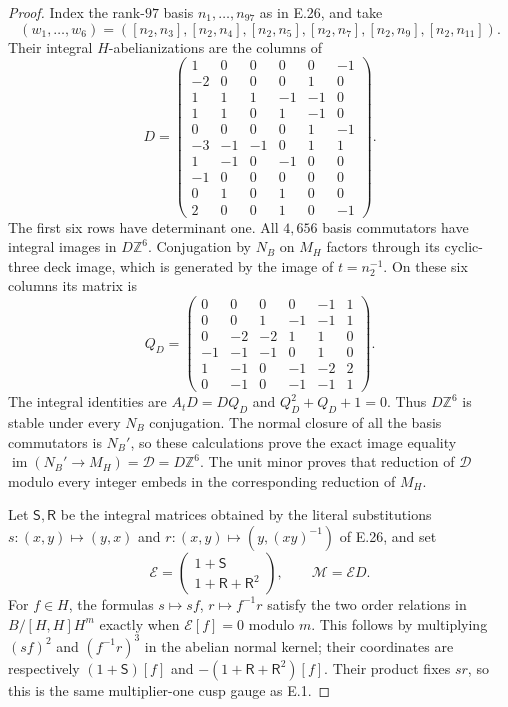 \begin{proof}
Index the rank-$97$ basis $n_1,\ldots,n_{97}$ as in E.26, and take
\[
 (w_1,\ldots,w_6)=
 ([n_2,n_3],[n_2,n_4],[n_2,n_5],
  [n_2,n_7],[n_2,n_9],[n_2,n_{11}]).
 \tag{E.28.4}
\]
Their integral $H$-abelianizations are the columns of
\[
 D=\begin{pmatrix}
 1&0&0&0&0&-1\\
 -2&0&0&0&1&0\\
 1&1&1&-1&-1&0\\
 1&1&0&1&-1&0\\
 0&0&0&0&1&-1\\
 -3&-1&-1&0&1&1\\
 1&-1&0&-1&0&0\\
 -1&0&0&0&0&0\\
 0&1&0&1&0&0\\
 2&0&0&1&0&-1
 \end{pmatrix}.
 \tag{E.28.5}
\]
The first six rows have determinant one.  All $4,656$ basis
commutators have integral images in $D\mathbb Z^6$.  Conjugation
by $N_B$ on $M_H$ factors through its cyclic-three deck image,
which is generated by the image of $t=n_2^{-1}$.  On these six
columns its matrix is
\[
 Q_D=\begin{pmatrix}
 0&0&0&0&-1&1\\
 0&0&1&-1&-1&1\\
 0&-2&-2&1&1&0\\
 -1&-1&-1&0&1&0\\
 1&-1&0&-1&-2&2\\
 0&-1&0&-1&-1&1
 \end{pmatrix}.
 \tag{E.28.6}
\]
The integral identities are $A_tD=DQ_D$ and
$Q_D^2+Q_D+1=0$.  Thus $D\mathbb Z^6$ is stable under every
$N_B$ conjugation.  The normal closure of all the basis
commutators is $N_B'$, so these calculations prove the exact
image equality
$\operatorname{im}(N_B'\to M_H)=\mathcal D=D\mathbb Z^6$.
The unit minor proves that reduction of $\mathcal D$ modulo
every integer embeds in the corresponding reduction of $M_H$.

Let $\mathsf S,\mathsf R$ be the integral matrices obtained by
the literal substitutions
$s:(x,y)\mapsto(y,x)$ and
$r:(x,y)\mapsto(y,(xy)^{-1})$ of E.26, and set
\[
 \mathcal E=\begin{pmatrix}1+\mathsf S\\
                         1+\mathsf R+\mathsf R^2\end{pmatrix},
 \qquad \mathcal M=\mathcal E D.
 \tag{E.28.7}
\]
For $f\in H$, the formulas
$s\mapsto sf$, $r\mapsto f^{-1}r$ satisfy the two order
relations in $B/[H,H]H^m$ exactly when
$\mathcal E[f]=0$ modulo $m$.  This follows by multiplying
$(sf)^2$ and $(f^{-1}r)^3$ in the abelian normal kernel;
their coordinates are respectively
$(1+\mathsf S)[f]$ and
$-(1+\mathsf R+\mathsf R^2)[f]$.
Their product fixes $sr$, so this is the same multiplier-one
cusp gauge as E.1.


\end{proof}
